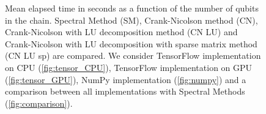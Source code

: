 \documentclass[rmp,10pt,onecolumn,fleqn,notitlepage]{revtex4-1}
\begin{document}
\begin{figure}[H]
\begin{minipage}[c]{0.49\linewidth}
\end{minipage}
\begin{minipage}[c]{0.49\linewidth}
\end{minipage}
\caption{Mean elapsed time in seconds as a function of the number of qubits in the chain. Spectral Method (SM), Crank-Nicolson method (CN),  Crank-Nicolson with LU decomposition method (CN LU) and Crank-Nicolson with LU decomposition with sparse matrix method (CN LU sp) are compared. We consider TensorFlow implementation on CPU (\ref{fig:tensor_CPU}),  TensorFlow implementation on GPU (\ref{fig:tensor_GPU}), NumPy implementation (\ref{fig:numpy}) and a comparison between all implementations with Spectral Methods (\ref{fig:comparison}).}
\label{fig:timing}
\end{figure}
\end{document}
